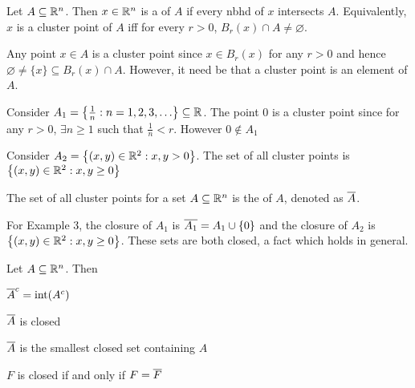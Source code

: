\documentclass[../main.tex]{subfiles}
\begin{document}
\begin{definition}
    Let $A \subseteq \mathbb{R}^n$. Then $x \in \mathbb{R}^n$ is a  of $A$ if every nbhd of $x$ intersects $A$. Equivalently, $x$ is a cluster point of $A$ iff for every $r > 0$, $B_r(x) \cap A \neq \varnothing$.
\end{definition}

\begin{remark}
    Any point $x \in A$ is a cluster point since $x \in B_r(x)$ for any $r > 0$ and hence $\varnothing \neq \{x\} \subseteq B_r(x) \cap A$. However, it need be that a cluster point is an element of $A$.
\end{remark}

\begin{example}
    \hfill
    \begin{romanlist}
        \item Consider $A_1 = \qty{\frac{1}{n} : n = 1,2,3,\ldots} \subseteq \mathbb{R}$. The point $0$ is a cluster point since for any $r > 0$, $\exists n \geq 1$ such that $\frac{1}{n} < r$. However $0 \notin A_1$
        \item Consider $A_2 = \qty{(x,y) \in \mathbb{R}^2 : x, y > 0}$. The set of all cluster points is $\qty{(x,y) \in \mathbb{R}^2 : x, y \geq 0 }$
    \end{romanlist}
\end{example}

\begin{definition}[Closure]
    The set of all cluster points for a set $A \subseteq \mathbb{R}^n$ is the  of $A$, denoted as $\overline{A}$.
\end{definition}

For Example 3, the closure of $A_1$ is $\overline{A_1} = A_1 \cup \qty{0}$ and the closure of $A_2$ is $\qty{(x,y) \in \mathbb{R}^2 : x, y \geq 0 }$. These sets are both closed, a fact which holds in general. \\

\begin{theorem}
    Let $A \subseteq \mathbb{R}^n$. Then
    \begin{romanlist}
        \item $\overline{A}^c = \operatorname{int}(A^c)$
        \item $\overline{A}$ is closed
        \item $\overline{A}$ is the smallest closed set containing $A$
        \item $F$ is closed if and only if $F = \overline{F}$ 
    \end{romanlist}
\end{theorem}
\end{document}
